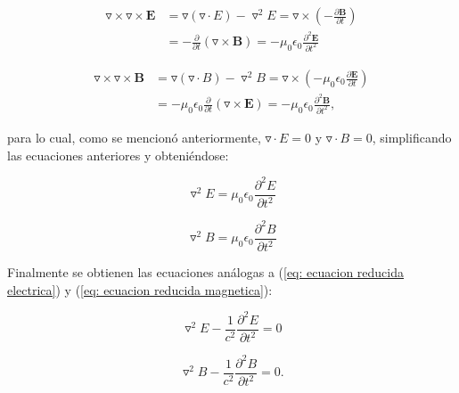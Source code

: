 \documentclass[12pt,letterpaper]{article}
\numberwithin{equation}{section}
\begin{document}
\begin{equation*}
\begin{split}
\triangledown\times\triangledown\times\textbf{E} &= \triangledown(\triangledown\cdot E)-\triangledown^2E=\triangledown\times\left(-\frac{\partial \textbf{B}}{\partial t}\right)\\
&= -\frac{\partial}{\partial t}(\triangledown\times\textbf{B})=-\mu_0\epsilon_0\frac{\partial^2\textbf{E}}{\partial t^2}
\end{split}
\end{equation*}

\begin{equation*}
\begin{split}
\triangledown\times\triangledown\times\textbf{B} &= \triangledown(\triangledown\cdot B)-\triangledown^2B=\triangledown\times\left(-\mu_0\epsilon_0\frac{\partial \textbf{E}}{\partial t}\right)\\
&= -\mu_0\epsilon_0\frac{\partial}{\partial t}(\triangledown\times\textbf{E})=-\mu_0\epsilon_0\frac{\partial^2\textbf{B}}{\partial t^2},
\end{split}
\end{equation*}

\noindent para lo cual, como se mencionó anteriormente, $\triangledown\cdot E = 0$ y $\triangledown\cdot B = 0$, simplificando las ecuaciones anteriores y obteniéndose:


\begin{equation}
\triangledown^2E = \mu_0\epsilon_0\frac{\partial^2E}{\partial t^2}
\label{eq: ecuacion reducida electrica}
\end{equation}

\begin{equation}
\triangledown^2B = \mu_0\epsilon_0\frac{\partial^2B}{\partial t^2}
\label{eq: ecuacion reducida magnetica}
\end{equation}

\noindent Finalmente se obtienen las ecuaciones análogas a (\ref{eq: ecuacion reducida electrica}) y (\ref{eq: ecuacion reducida magnetica}):


\begin{equation}
\triangledown^2E - \frac{1}{c^2}\frac{\partial^2E}{\partial t^2}= 0
\label{eq: ecuacion onda electrica}
\end{equation}

\begin{equation}
\triangledown^2B - \frac{1}{c^2}\frac{\partial^2B}{\partial t^2}= 0.
\label{eq: ecuacion onda magnetica}
\end{equation}
\end{document}
